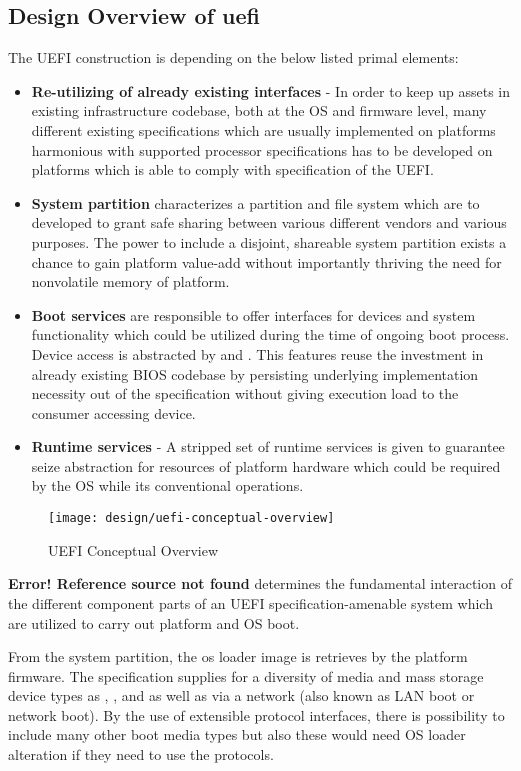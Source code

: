 \subsection{Design Overview of \gls{uefi}}
The UEFI construction is depending on the below listed primal elements:

\begin{itemize}
	\item \textbf{Re-utilizing of already existing interfaces} - In order to keep up assets in existing infrastructure  codebase, both at the OS and firmware level, many different existing specifications which are usually implemented on platforms harmonious with supported processor specifications has to be developed on platforms which is able to comply with specification of the UEFI.
	\item \textbf{System partition} characterizes a partition and file system which are to developed to grant safe sharing between various different vendors and various purposes. The power to include a disjoint, shareable system partition exists a chance to gain platform value-add without importantly thriving the need for nonvolatile memory of platform.
	\item \textbf{Boot services} are responsible to offer interfaces for devices and system functionality which could be utilized during the time of ongoing boot process. Device access is abstracted by  and . This features reuse the investment in already existing BIOS codebase by persisting underlying implementation necessity out of the specification without giving execution load to the consumer accessing device.
	\item \textbf{Runtime services} - A stripped set of runtime services is given to guarantee seize abstraction for resources of platform hardware which could be required by the OS while its conventional operations.
\end{itemize}

\begin{figure}[h]
	\centering
	\texttt{[image: design/uefi-conceptual-overview]}
	\caption{UEFI Conceptual Overview}\label{fig:design-uefi-conceptual-overview}
\end{figure}

\textbf{Error! Reference source not found} determines the fundamental interaction of the different component parts of an UEFI specification-amenable system which are utilized to carry out platform and OS boot.

From the system partition, the os loader image is retrieves by the platform firmware. The specification supplies for a diversity of media and mass storage device types as , , and  as well as  via a network (also known as LAN boot or network boot). By the use of extensible protocol interfaces, there is possibility to include many other boot media types but also these would need OS loader alteration if they need to use the protocols.

